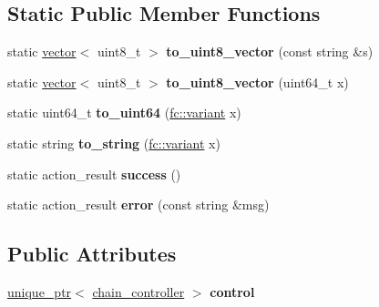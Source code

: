\subsection*{Static Public Member Functions}
\begin{DoxyCompactItemize}
\item 
\mbox{\label{classaacio_1_1testing_1_1base__tester_a6116609299e6ad51ad409b48faf16e16}} 
static \mbox{\hyperlink{classstd_1_1vector}{vector}}$<$ uint8\+\_\+t $>$ {\bfseries to\+\_\+uint8\+\_\+vector} (const string \&s)
\item 
\mbox{\label{classaacio_1_1testing_1_1base__tester_a5cce52f9063f14bb9a1d81b0aae3cc7f}} 
static \mbox{\hyperlink{classstd_1_1vector}{vector}}$<$ uint8\+\_\+t $>$ {\bfseries to\+\_\+uint8\+\_\+vector} (uint64\+\_\+t x)
\item 
\mbox{\label{classaacio_1_1testing_1_1base__tester_a1c4789032a1f05de20bf0ca41ebc4b14}} 
static uint64\+\_\+t {\bfseries to\+\_\+uint64} (\mbox{\hyperlink{classfc_1_1variant}{fc\+::variant}} x)
\item 
\mbox{\label{classaacio_1_1testing_1_1base__tester_abe6ae2966637d7fcdd39078e2c8c8ad4}} 
static string {\bfseries to\+\_\+string} (\mbox{\hyperlink{classfc_1_1variant}{fc\+::variant}} x)
\item 
\mbox{\label{classaacio_1_1testing_1_1base__tester_a1a9e6db3d66e53d40b22e70838a3760d}} 
static action\+\_\+result {\bfseries success} ()
\item 
\mbox{\label{classaacio_1_1testing_1_1base__tester_a05152eb3263c7f35d7ccf5711b818799}} 
static action\+\_\+result {\bfseries error} (const string \&msg)
\end{DoxyCompactItemize}
\subsection*{Public Attributes}
\begin{DoxyCompactItemize}
\item 
\mbox{\label{classaacio_1_1testing_1_1base__tester_a5ab6e75d594670d547743a7db11babb7}} 
\mbox{\hyperlink{classfc_1_1unique__ptr}{unique\+\_\+ptr}}$<$ \mbox{\hyperlink{classaacio_1_1chain_1_1chain__controller}{chain\+\_\+controller}} $>$ {\bfseries control}
\end{DoxyCompactItemize}
